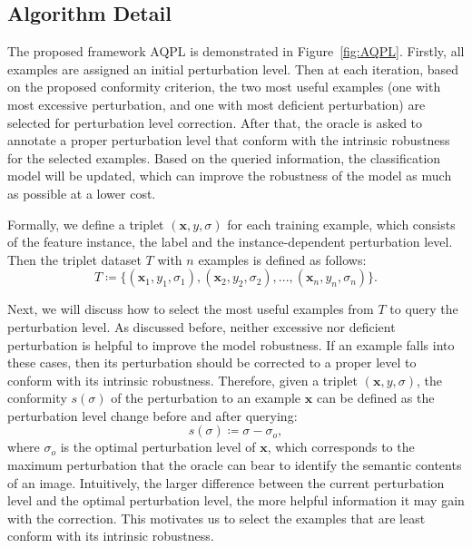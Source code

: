 \documentclass[letterpaper]{article} %
\begin{document}
\subsection{Algorithm Detail}
%

The proposed framework AQPL is demonstrated in Figure~\ref{fig:AQPL}. Firstly, all examples are assigned an initial perturbation level. Then at each iteration, based on the proposed conformity criterion, the two most useful examples (one with most excessive perturbation, and one with most deficient perturbation) are selected for perturbation level correction. After that, the oracle is asked to annotate a proper perturbation level that conform with the intrinsic robustness for the selected examples. Based on the queried information, the classification model will be updated, which can improve the robustness of the model as much as possible at a lower cost.

Formally, we define a triplet $(\mathbf{x}, y, \sigma)$ for each training example, which consists of the feature instance, the label and the instance-dependent perturbation level. Then the triplet dataset $T$ with $n$ examples is defined as follows:
\begin{equation}
T \coloneqq \{(\mathbf{x}_1,y_1,\sigma_1),(\mathbf{x}_2,y_2,\sigma_2),...,(\mathbf{x}_n,y_n,\sigma_n)\}.
\end{equation}

Next, we will discuss how to select the most useful examples from $T$ to query the perturbation level. As discussed before, neither excessive nor deficient perturbation is helpful to improve the model robustness. If an example falls into these cases, then its perturbation should be corrected to a proper level to conform with its intrinsic robustness. Therefore, given a triplet $(\mathbf{x},y,\sigma)$, the conformity $s(\sigma)$ of the perturbation to an example $\mathbf{x}$ can be defined as the perturbation level change before and after querying:
\begin{equation}\label{Eq:suitability}
s(\sigma) \coloneqq \sigma-\sigma_o,
\end{equation}
where $\sigma_o$ is the optimal perturbation level of $\mathbf{x}$, which corresponds to the maximum perturbation that the oracle can bear to identify the semantic contents of an image. Intuitively, the larger difference between the current perturbation level and the optimal perturbation level, the more helpful information it may gain with the correction. This motivates us to select the examples that are least conform with its intrinsic robustness.
\end{document}
